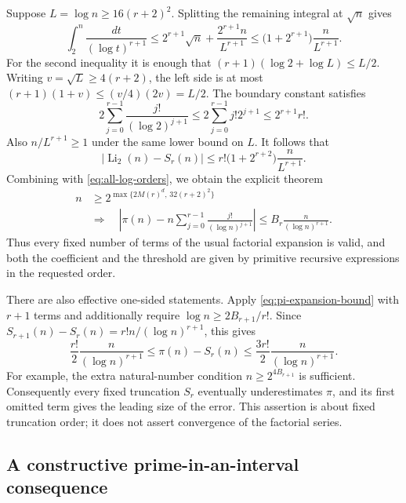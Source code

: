 Suppose $L=\log n\ge16(r+2)^2$.  Splitting the remaining integral at
$\sqrt n$ gives
\[
 \int_2^n\frac{dt}{(\log t)^{r+1}}
 \le 2^{r+1}\sqrt n+\frac{2^{r+1}n}{L^{r+1}}
 \le\bigl(1+2^{r+1}\bigr)\frac n{L^{r+1}}.
\]
For the second inequality it is enough that
$(r+1)(\log2+\log L)\le L/2$.
Writing $v=\sqrt L\ge4(r+2)$, the left side is at most
$(r+1)(1+v)\le(v/4)(2v)=L/2$.
The boundary constant satisfies
\[
 2\sum_{j=0}^{r-1}\frac{j!}{(\log2)^{j+1}}
 \le2\sum_{j=0}^{r-1}j!2^{j+1}
 \le2^{r+1}r!.
\]
Also $n/L^{r+1}\ge1$ under the same lower bound on $L$.
It follows that
\begin{equation}\label{eq:Li-expansion-bound}
 |\operatorname{Li}_2(n)-S_r(n)|
 \le r!\bigl(1+2^{r+2}\bigr)\frac n{L^{r+1}}.
\end{equation}
Combining with \eqref{eq:all-log-orders}, we obtain the explicit theorem
\begin{equation}\label{eq:pi-expansion-bound}
 \begin{split}
 n&\ge2^{\max\{2M(r)^d,\,32(r+2)^2\}}\\
 &\Longrightarrow\quad
 \left|\pi(n)-n\sum_{j=0}^{r-1}\frac{j!}{(\log n)^{j+1}}\right|
 \le B_r\frac n{(\log n)^{r+1}}.
 \end{split}
\end{equation}
Thus every fixed number of terms of the usual factorial expansion is
valid, and both the coefficient and the threshold are given by primitive
recursive expressions in the requested order.

There are also effective one-sided statements.  Apply
\eqref{eq:pi-expansion-bound} with $r+1$ terms and additionally require
$\log n\ge2B_{r+1}/r!$.  Since
$S_{r+1}(n)-S_r(n)=r!n/(\log n)^{r+1}$, this gives
\[
 \frac{r!}{2}\frac n{(\log n)^{r+1}}
 \le\pi(n)-S_r(n)
 \le\frac{3r!}{2}\frac n{(\log n)^{r+1}}.
\]
For example, the extra natural-number condition
$n\ge2^{4B_{r+1}}$ is sufficient.  Consequently every fixed truncation
$S_r$ eventually underestimates $\pi$, and its first omitted term gives
the leading size of the error.  This assertion is about fixed
truncation order; it does not assert convergence of the factorial series.

\subsection{A constructive prime-in-an-interval consequence}


